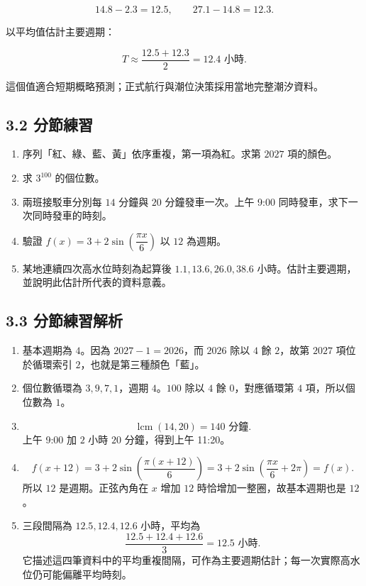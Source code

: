 \documentclass[11pt,a4paper]{article}
\providecommand{\tightlist}{%
  \setlength{\itemsep}{0pt}\setlength{\parskip}{0pt}}
\begin{document}
\[
14.8-2.3=12.5,\qquad27.1-14.8=12.3.
\]

以平均值估計主要週期：

\[
T\approx\frac{12.5+12.3}{2}=12.4\text{ 小時}.
\]

這個值適合短期概略預測；正式航行與潮位決策採用當地完整潮汐資料。

\subsection{3.2 分節練習}\label{ux5206ux7bc0ux7df4ux7fd2-2}

\begin{enumerate}
\def\labelenumi{\arabic{enumi}.}
\tightlist
\item
  序列「紅、綠、藍、黃」依序重複，第一項為紅。求第 \(2027\) 項的顏色。
\item
  求 \(3^{100}\) 的個位數。
\item
  兩班接駁車分別每 \(14\) 分鐘與 \(20\) 分鐘發車一次。上午 9:00 同時發車，求下一次同時發車的時刻。
\item
  驗證 \(f(x)=3+2\sin\left(\dfrac{\pi x}{6}\right)\) 以 \(12\) 為週期。
\item
  某地連續四次高水位時刻為起算後 \(1.1,13.6,26.0,38.6\) 小時。估計主要週期，並說明此估計所代表的資料意義。
\end{enumerate}

\subsection{3.3 分節練習解析}\label{ux5206ux7bc0ux7df4ux7fd2ux89e3ux6790-2}

\begin{enumerate}
\def\labelenumi{\arabic{enumi}.}
\tightlist
\item
  基本週期為 \(4\)。因為 \(2027-1=2026\)，而 \(2026\) 除以 \(4\) 餘 \(2\)，故第 \(2027\) 項位於循環索引 \(2\)，也就是第三種顏色「藍」。
\item
  個位數循環為 \(3,9,7,1\)，週期 \(4\)。\(100\) 除以 \(4\) 餘 \(0\)，對應循環第 \(4\) 項，所以個位數為 \(1\)。
\item
  \[\operatorname{lcm}(14,20)=140\text{ 分鐘}.\]
  上午 9:00 加 \(2\) 小時 \(20\) 分鐘，得到上午 11:20。
\item
  \[f(x+12)=3+2\sin\left(\frac{\pi(x+12)}6\right)
  =3+2\sin\left(\frac{\pi x}{6}+2\pi\right)=f(x).\]
  所以 \(12\) 是週期。正弦內角在 \(x\) 增加 \(12\) 時恰增加一整圈，故基本週期也是 \(12\)。
\item
  三段間隔為 \(12.5,12.4,12.6\) 小時，平均為
  \[\frac{12.5+12.4+12.6}{3}=12.5\text{ 小時}.\]
  它描述這四筆資料中的平均重複間隔，可作為主要週期估計；每一次實際高水位仍可能偏離平均時刻。
\end{enumerate}
\end{document}
